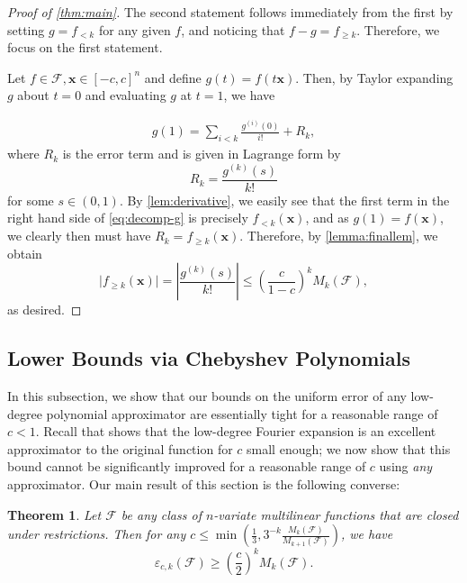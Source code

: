 \documentclass[10pt,a4paper]{article}
\newcommand{\eps}{\varepsilon}
\newtheorem{THM}[theorem]{Theorem}
\theoremstyle{definition}
\begin{document}
    \begin{proof}[Proof of \cref{thm:main}]
    The second statement follows immediately from the first by setting $g=f_{<k}$ for any given $f$, and noticing that $f-g=f_{\geq k}$. Therefore, we focus on the first statement.
    
Let $f\in \mathcal{F}, \mathbf{x}\in [-c,c]^n$ and define $g(t)=f(t\mathbf{x})$. Then, by Taylor expanding $g$ about $t=0$ and evaluating $g$ at $t=1$, we have

\begin{align} \label{eq:decomp-g}
    g(1)=\sum_{i<k} \frac{g^{(i)}(0)}{i!} +R_k, 
\end{align}
where $R_k$ is the error term and is given in Lagrange form by
\begin{equation*}
    R_k = \frac{g^{(k)}(s)}{k!}
\end{equation*}
for some $s\in (0,1)$. By \cref{lem:derivative}, we easily see that the first term in the right hand side of \cref{eq:decomp-g} is precisely $f_{<k}(\mathbf{x})$, and as $g(1)=f(\mathbf{x})$, we clearly then must have $R_k = f_{\geq k}(\mathbf{x})$.  Therefore, by \cref{lemma:finallem}, we obtain
\begin{equation*}
    \vert f_{\geq k}(\mathbf{x})\vert = \left\vert\frac{g^{(k)}(s)}{k!}\right\vert \leq \left(\frac{c}{1-c}\right)^k M_k(\mathcal{F}),
\end{equation*}
as desired.
\end{proof}

\subsection{Lower Bounds via Chebyshev Polynomials}

In this subsection, we show that our bounds on the uniform error of any low-degree polynomial approximator are essentially tight for a reasonable range of $c<1$. Recall that  shows that the low-degree Fourier expansion is an excellent approximator to the original function for $c$ small enough; we now show that this bound cannot be significantly improved for a reasonable range of $c$ using \emph{any} approximator. Our main result of this section is the following converse:


\begin{THM}
\label{thm:cheby}
Let $\mathcal{F}$ be any class of $n$-variate multilinear functions that are closed under restrictions.  Then for any $c\leq \min\left(\frac{1}{3}, 3^{-k} \frac{M_k(\mathcal{F})}{M_{k+1}(\mathcal{F})}\right)$, we have
\begin{equation*}
    \eps_{c,k}(\mathcal{F}) \geq \left(\frac{c}{2}\right)^k M_k(\mathcal{F}).
\end{equation*}
\end{THM}
\end{document}
